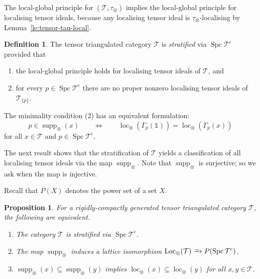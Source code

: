 \documentclass{amsart}[a4]
\newtheorem{proposition}[theorem]{Proposition}
\theoremstyle{definition}
\newtheorem{definition}[theorem]{Definition}
\theoremstyle{remark}
\numberwithin{equation}{section}
\newcommand{\loc}{\operatorname{loc}}
\newcommand{\Loc}{\operatorname{Loc}}
\newcommand{\Spc}{\operatorname{Spc}}
\newcommand{\supp}{\operatorname{supp}}
\newcommand{\iso}{\xrightarrow{\raisebox{-.6ex}[0ex][0ex]{$\scriptstyle{\sim}$}}}
\newcommand{\cat}{\mathcal}
\newcommand{\one}{\mathds 1}
\let\Gamma\varGamma
\begin{document}
The local-global principle for $(\cat T,\tau_\otimes)$ implies the
local-global principle for localising tensor ideals, because any
localising tensor ideal is $\tau_\otimes$-localising by
Lemma~\ref{le:tensor-tau-local}.

\begin{definition}
  The tensor triangulated category $\cat T$ is \emph{stratified} via
  $\Spc\cat T^{\mathrm c}$ provided that
\begin{enumerate}
\item   the local-global principle holds for
  localising tensor ideals of $\cat T$, and
\item  for every
  $p\in\Spc\cat T^{\mathrm c}$ there are no proper nonzero localising tensor
  ideals of $\cat T_{\{p\}}$.
\end{enumerate}
The minimality condition (2) has an equivalent formulation:
\begin{equation}\label{eq:minimality}
  p\in\supp_\otimes(x)\qquad\iff\qquad\loc_\otimes(\Gamma_p(\one))=\loc_\otimes(\Gamma_p(x))
\end{equation}  
for all $x\in\cat T$ and $p\in\Spc\cat T^{\mathrm c}$. 
\end{definition}

The next result shows that the stratification of $\cat T$ yields a
classification of all localising tensor ideals via the map
$\supp_\otimes$.  Note that $\supp_\otimes$ is surjective; so we ask
when the map is injective.

Recall that $P(X)$ denotes the power set
of a set $X$.


\begin{proposition}\label{pr:stratification-tensor}
For a rigidly-compactly generated tensor triangulated category $\cat T$, the
following are equivalent.
\begin{enumerate}
\item The category $\cat T$ is stratified via $\Spc\cat T^{\mathrm c}$.
\item The map $\supp_\otimes$ induces
  a lattice isomorphism $\Loc_\otimes(\cat T)\iso P(\Spc\cat T^{\mathrm c})$.
\item $\supp_\otimes(x)\subseteq\supp_\otimes(y)$ implies
  $\loc_\otimes(x)\subseteq\loc_\otimes(y)$ for all $x,y\in\cat T$.
\end{enumerate}
\end{proposition}
\end{document}
